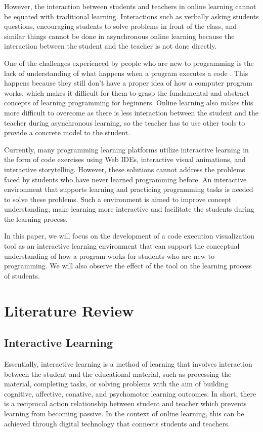 \documentclass[conference]{IEEEtran}
\begin{document}
However, the interaction between students and teachers in online learning cannot be equated with traditional learning. Interactions such as verbally asking students questions, encouraging students to solve problems in front of the class, and similar things cannot be done in asynchronous online learning because the interaction between the student and the teacher is not done directly.

One of the challenges experienced by people who are new to programming is the lack of understanding of what happens when a program executes a code \cite{mayer1981psychology, moons2013pilot}. This happens because they still don't have a proper idea of how a computer program works, which makes it difficult for them to grasp the fundamental and abstract concepts of learning programming for beginners. Online learning also makes this more difficult to overcome as there is less interaction between the student and the teacher during asynchronous learning, so the teacher has to use other tools to provide a concrete model to the student.

Currently, many programming learning platforms utilize interactive learning in the form of code exercises using Web IDEs, interactive visual animations, and interactive storytelling. However, these solutions cannot address the problems faced by students who have never learned programming before. An interactive environment that supports learning and practicing programming tasks is needed to solve these problems. Such a environment is aimed to improve concept understanding, make learning more interactive and facilitate the students during the learning process.

In this paper, we will focus on the development of a code execution visualization tool as an interactive learning environment that can support the conceptual understanding of how a program works for students who are new to programming. We will also observe the effect of the tool on the learning process of students.

\section{Literature Review}
\subsection{Interactive Learning}
Essentially, interactive learning is a method of learning that involves interaction between the student and the educational material, such as processing the material, completing tasks, or solving problems with the aim of building cognitive, affective, conative, and psychomotor learning outcomes. In short, there is a reciprocal action relationship between student and teacher which prevents learning from becoming passive. In the context of online learning, this can be achieved through digital technology that connects students and teachers.
\end{document}
